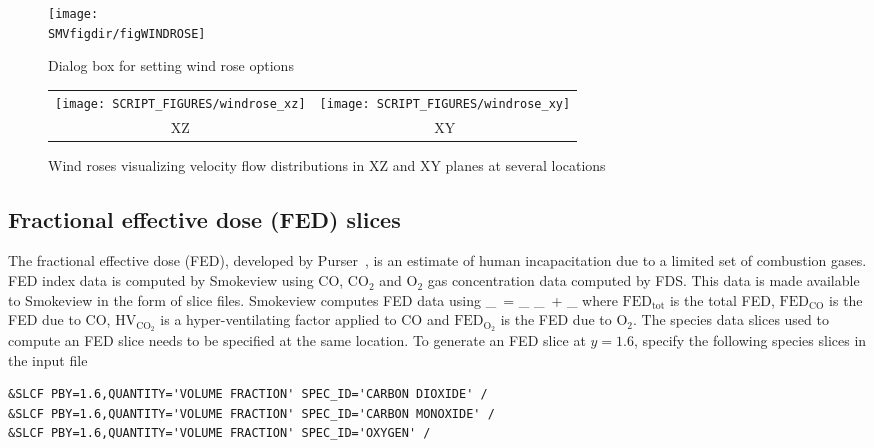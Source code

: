 \documentclass[11pt,twoside]{book}
\begin{document}
\begin{figure}[bph]
\centerline{
\texttt{[image: \\SMVfigdir/figWINDROSE]}
}
\caption[Dialog box for setting wind rose options]
{Dialog box for setting wind rose options}
\label{figWINDROSE}
\end{figure}

\begin{figure}[bph]
\begin{center}
\begin{tabular}{cc}
\texttt{[image: SCRIPT\_FIGURES/windrose\_xz]}&
\texttt{[image: SCRIPT\_FIGURES/windrose\_xy]}\\
XZ&XY
\end{tabular}
\end{center}
\caption[Wind roses visualizing velocity flow distributions in XZ and XY planes at several locations]
{Wind roses visualizing velocity flow distributions in XZ and XY planes at several locations}
\label{figWINDROSEplots}
\end{figure}

\subsection{Fractional effective dose (FED) slices}
The fractional effective dose (FED), developed by Purser~\cite{SFPE:Purser},
is an estimate of human incapacitation
due to a limited set of combustion gases.
FED index data is computed by Smokeview using CO, $\mathrm{CO_2}$ and $\mathrm{O_2}$ gas
concentration data computed by FDS.
This data is made available to Smokeview in the form of slice files.
Smokeview computes FED data using
\be
{}_\ = _
\times {}_\ + _
\ee
where $\mathrm{FED}_\mathrm{tot}$ is the total FED,
$\mathrm{FED}_\mathrm{CO}$ is the FED due to CO,
$\mathrm{HV}_\mathrm{CO_2}$ is a hyper-ventilating factor
applied to CO and $\mathrm{FED}_\mathrm{O_2}$
is the FED due to $\mathrm{O_2}$.
The species data slices used to compute an FED slice needs to be specified at the
same location.  To generate an FED slice at $y=1.6$, specify the following species slices in the input file
\begin{lstlisting}
&SLCF PBY=1.6,QUANTITY='VOLUME FRACTION' SPEC_ID='CARBON DIOXIDE' /
&SLCF PBY=1.6,QUANTITY='VOLUME FRACTION' SPEC_ID='CARBON MONOXIDE' /
&SLCF PBY=1.6,QUANTITY='VOLUME FRACTION' SPEC_ID='OXYGEN' /
\end{lstlisting}
\end{document}
